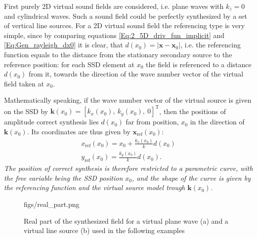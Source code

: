 \documentclass[12pt,a4paper]{article}
\newcommand{\vx}{\mathbf{x}}
\newcommand{\vxo}{\mathbf{x}_0}
\begin{document}
First purely 2D virtual sound fields are considered, i.e. plane waves with $k_z=0$ and cylindrical waves. Such a sound field could be perfectly synthesized by a set of vertical line sources.
For a 2D virtual sound field the referencing type is very simple, since by comparing equations \ref{Eq:2_5D_driv_fun_implicit} and \eqref{Eq:Gen_rayleigh_dx0} it is clear, that $d(x_0) = |\vx-\vxo|$, i.e. the referencing function equals to the distance from the stationary secondary source to the reference position: for each SSD element at $x_0$ the field is referenced to a distance $d(x_0)$ from it, towards the direction of the wave number vector of the virtual field taken at $x_0$.

Mathematically speaking, if the wave number vector of the virtual source is given on the SSD by $\mathbf{k}(x_0) = [k_x(x_0),\ k_y(x_0),\ 0]^{\mathrm{T}}$, then the positions of amplitude correct synthesis lies $d(x_0)$ far from position, $x_0$ in the direction of $\mathbf{k}(x_0)$. Its coordinates are thus given by $\mathbf{x}_{\mathrm{ref}}(x_0)$:
\begin{eqnarray}
x_{\mathrm{ref}}(x_0) = x_0 + \frac{k_x(x_0)}{k} d(x_0) \\
y_{\mathrm{ref}}(x_0) = \frac{k_y(x_0)}{k} d(x_0).
\end{eqnarray}
\emph{The position of correct synthesis is therefore restricted to a parametric curve, with the free variable being the SSD position $x_0$, and the shape of the curve is given by the referencing function and the virtual source model trough $\mathbf{k}(x_0)$.}

\begin{figure}
	\centering
	\begin{overpic}[width = 1\columnwidth ]{figs/real_part.png}
	\scriptsize
	\end{overpic}
\caption{Real part of the synthesized field for a virtual plane wave (a) and a virtual line source (b) used in the following examples}
	\label{Fig:Theory:Real_part}
\end{figure}
\end{document}
